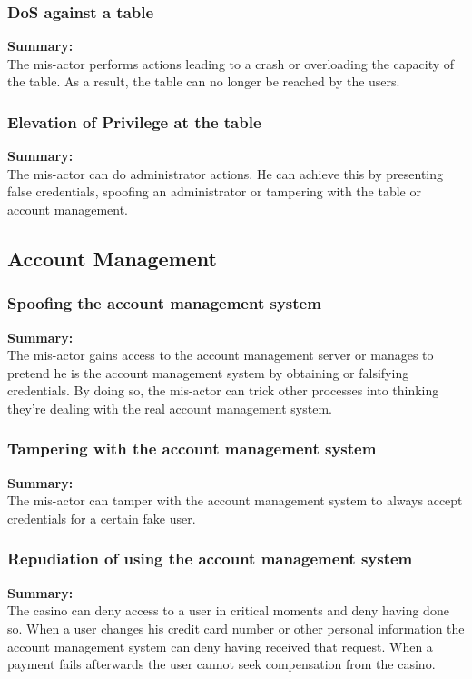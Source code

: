 \documentclass[a4paper,11pt]{report}
\begin{document}
\subsubsection{DoS against a table}
\label{TableCasesD}
\textbf{Summary:} \\
The mis-actor performs actions leading to a crash or overloading the capacity of the table. As a result, the table can no longer be reached by the users.

\subsubsection{Elevation of Privilege at the table}
\label{TableCasesE}
\textbf{Summary:} \\
The mis-actor can do administrator actions. He can achieve this by presenting false credentials, spoofing an administrator or tampering with the table or account management.

\subsection{Account Management}
\label{AccountManagementCases}

\subsubsection{Spoofing the account management system}
\label{AccountManagementCasesS}
\textbf{Summary:} \\
The mis-actor gains access to the account management server or manages to pretend he is the account management system by obtaining or falsifying credentials. By doing so, the mis-actor can trick other processes into thinking they're dealing with the real account management system.

\subsubsection{Tampering with the account management system}
\label{AccountManagementCasesT}
\textbf{Summary:} \\
The mis-actor can tamper with the account management system to always accept credentials for a certain fake user.

\subsubsection{Repudiation of using the account management system}
\label{AccountManagementCasesR}
\textbf{Summary:} \\
The casino can deny access to a user in critical moments and deny having done so. When a user changes his credit card number or other personal information the account management system can deny having received that request. When a payment fails afterwards the user cannot seek compensation from the casino.
\end{document}
